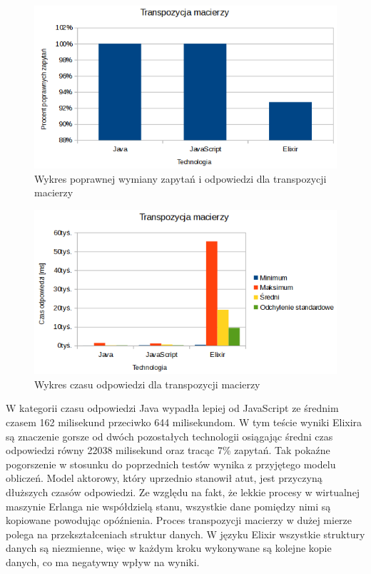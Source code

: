 \documentclass[12pt,twoside]{article}
\begin{document}
\begin{figure}[!ht]
\centering
\includegraphics[resolution=120]{test_results/summary/matrix_percentage.png}
\caption{Wykres poprawnej wymiany zapytań i odpowiedzi dla transpozycji macierzy}
\end{figure}

\begin{figure}[!ht]
\centering
\includegraphics[resolution=120]{test_results/summary/matrix_response.png}
\caption{Wykres czasu odpowiedzi dla transpozycji macierzy}
\end{figure}

W kategorii czasu odpowiedzi Java wypadła lepiej od JavaScript ze
średnim czasem 162 milisekund przeciwko 644 milisekundom. W tym teście
wyniki Elixira są znaczenie gorsze od dwóch pozostałych technologii
osiągając średni czas odpowiedzi równy 22038 milisekund oraz tracąc 7\%
zapytań. Tak pokaźne pogorszenie w stosunku do poprzednich testów wynika
z przyjętego modelu obliczeń. Model aktorowy, który uprzednio stanowił
atut, jest przyczyną dłuższych czasów odpowiedzi. Ze względu na fakt, że
lekkie procesy w wirtualnej maszynie Erlanga nie współdzielą stanu,
wszystkie dane pomiędzy nimi są kopiowane powodując opóźnienia. Proces
transpozycji macierzy w dużej mierze polega na przekształceniach
struktur danych. W języku Elixir wszystkie struktury danych są
niezmienne, więc w każdym kroku wykonywane są kolejne kopie danych, co
ma negatywny wpływ na wyniki.
\end{document}
